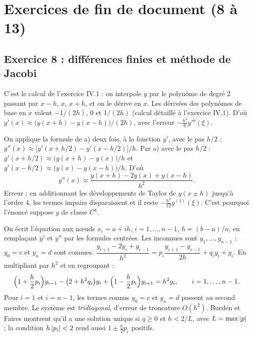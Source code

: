 \chapter{Exercices de fin de document (8 à 13)}

\section{Exercice 8 : différences finies et méthode de Jacobi}

\Pourquoi C'est le calcul de l'exercice IV.1 : on interpole $y$ par le polynôme
de degré 2 passant par $x - h$, $x$, $x + h$, et on le dérive en $x$.
\Etapes
{} Les dérivées des polynômes de base en $x$ valent $-1/(2h)$, $0$ et
$1/(2h)$ (calcul détaillé à l'exercice IV.1).
 D'où $y'(x) \approx \bigl(y(x+h) - y(x-h)\bigr)/(2h)$, avec l'erreur
$-\frac{h^2}{6}y'''(\xi)$.

\Pourquoi On applique la formule de a) deux fois, à la fonction $y'$, avec le pas
$h/2$ : $y''(x) \approx \bigl[y'(x + h/2) - y'(x - h/2)\bigr]/h$.
\Etapes
{} Par a) avec le pas $h/2$ : $y'(x + h/2) \approx \bigl(y(x+h) - y(x)\bigr)/h$
et $y'(x - h/2) \approx \bigl(y(x) - y(x-h)\bigr)/h$.
 D'où
\[
  y''(x) \approx \frac{y(x+h) - 2y(x) + y(x-h)}{h^2} .
\]
 Erreur : en additionnant les développements de Taylor de $y(x \pm h)$
jusqu'à l'ordre 4, les termes impairs disparaissent et il reste
$-\frac{h^2}{12}y^{(4)}(\xi)$. C'est pourquoi l'énoncé suppose $y$ de classe
$C^4$.

\Pourquoi On écrit l'équation aux nœuds $x_i = a + ih$, $i = 1, \dots, n-1$,
$h = (b-a)/n$, en remplaçant $y'$ et $y''$ par les formules centrées. Les
inconnues sont $y_1, \dots, y_{n-1}$ ; $y_0 = c$ et $y_n = d$ sont connues.
\Etapes
{} $\dfrac{y_{i+1} - 2y_i + y_{i-1}}{h^2}
          = p_i\dfrac{y_{i+1} - y_{i-1}}{2h} + q_iy_i + g_i$.
 En multipliant par $h^2$ et en regroupant :
\[
  \Bigl(1 + \frac h2p_i\Bigr)y_{i-1} - \bigl(2 + h^2q_i\bigr)y_i
  + \Bigl(1 - \frac h2p_i\Bigr)y_{i+1} = h^2g_i, \qquad i = 1, \dots, n-1 .
\]
 Pour $i = 1$ et $i = n-1$, les termes connus $y_0 = c$ et $y_n = d$
passent au second membre. Le système est \emph{tridiagonal}, d'erreur de
troncature $O(h^2)$. Burden et Faires montrent qu'il a une solution unique si
$q \ge 0$ et $h < 2/L$, avec $L = \max\left|p\right|$  ; la
condition $h\left|p_i\right| < 2$ rend aussi $1 \pm \frac h2p_i$ positifs.

